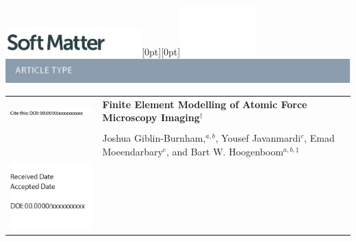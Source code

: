   \begin{@twocolumnfalse}
{\includegraphics[height=30pt]{Misc/SM}\hfill\raisebox{0pt}[0pt][0pt]{\includegraphics[height=55pt]{Misc/RSC_LOGO_CMYK}}\\[1ex]
\includegraphics[width=18.5cm]{Misc/header_bar}}\par
\vspace{1em}
\sffamily
\begin{tabular}{m{4.5cm} p{13.5cm} }

\includegraphics{Misc/DOI} & \noindent\LARGE{\textbf{Finite Element Modelling of Atomic Force Microscopy Imaging$^\dag$}} \\%
\vspace{0.3cm} & \vspace{0.3cm} \\

 & \noindent\large{Joshua Giblin-Burnham,\textit{$^{a,b}$}, Yousef Javanmardi\textit{$^{c}$}, Emad Moeendarbary\textit{$^{c}$}, and Bart W. Hoogenboom\textit{$^{a,b,\ddag}$} } \\
 

\includegraphics{Misc/dates} & \noindent\normalsize{ } \\


\end{tabular}

 \end{@twocolumnfalse} \vspace{0.6cm}

